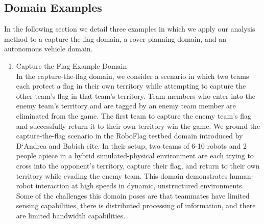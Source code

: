 \documentclass[letterpaper, 10 pt, conference]{ieeeconf}  %
\theoremstyle{definition}
\begin{document}

\subsection{Domain Examples}
In the following section we detail three examples in which we apply our analysis method to a capture the flag domain, a rover planning domain, and an autonomous vehicle domain. 
\begin{enumerate}
\item Capture the Flag Example Domain
\\In the capture-the-flag domain, we consider a scenario in which two teams each protect a flag in their own territory while attempting to capture the other team's flag in that team's territory. Team members who enter into the enemy team's territory and are tagged by an enemy team member are eliminated from the game. The first team to capture the enemy team's flag and successfully return it to their own territory win the game. We ground the capture-the-flag scenario in the RoboFlag testbed domain introduced by D`Andrea and Babish {cite}. In their setup, two teams of 6-10 robots and 2 people apiece in a hybrid simulated-physical environment are each trying to cross into the opponent’s territory, capture their flag, and return to their own territory while evading the enemy team. This domain demonstrates human-robot interaction at high speeds in dynamic, unstructured environments. Some of the challenges this domain poses are that teammates have limited sensing capabilities, there is distributed processing of information, and there are limited bandwidth capabilities.


\end{enumerate}
\end{document}
